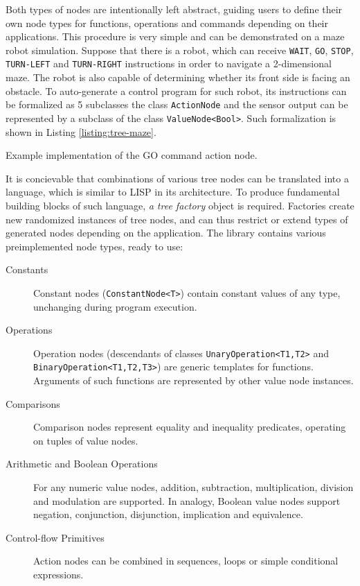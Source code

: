 Both types of nodes are intentionally left abstract, guiding users to define their own node types for functions, operations and commands depending on their applications. This procedure is very simple and can be demonstrated on a maze robot simulation. Suppose that there is a robot, which can receive \texttt{WAIT}, \texttt{GO}, \texttt{STOP}, \texttt{TURN-LEFT} and \texttt{TURN-RIGHT} instructions in order to navigate a 2-dimensional maze. The robot is also capable of determining whether its front side is facing an obstacle. To auto-generate a control program for such robot, its instructions can be formalized as 5 subclasses the class \texttt{ActionNode} and the sensor output can be represented by a subclass of the class \texttt{ValueNode<Bool>}. Such formalization is shown in Listing \ref{listing:tree-maze}.

\begin{listing}[ht]
	\caption{Example implementation of the GO command action node.}
	\label{listing:tree-maze}
\end{listing}

It is concievable that combinations of various tree nodes can be translated into a language, which is similar to LISP in its architecture. To produce fundamental building blocks of such language, \textit{a tree factory} object is required. Factories create new randomized instances of tree nodes, and can thus restrict or extend types of generated nodes depending on the application. The library contains various preimplemented node types, ready to use:
~
\begin{description} 
	\item[Constants]
	Constant nodes (\texttt{ConstantNode<T>}) contain constant values of any type, unchanging during program execution.

	\item[Operations]
	Operation nodes (descendants of classes \texttt{UnaryOperation<T1,T2>} and \texttt{BinaryOperation<T1,T2,T3>}) are generic templates for functions. Arguments of such functions are represented by other value node instances.

\todo %

	\item[Comparisons]
	Comparison nodes represent equality and inequality predicates, operating on tuples of value nodes.

	\item[Arithmetic and Boolean Operations]
	For any numeric value nodes, addition, subtraction, multiplication, division and modulation are supported. In analogy, Boolean value nodes support negation, conjunction, disjunction, implication and equivalence.

	\item[Control-flow Primitives]
	Action nodes can be combined in sequences, loops or simple conditional expressions.
\end{description}

